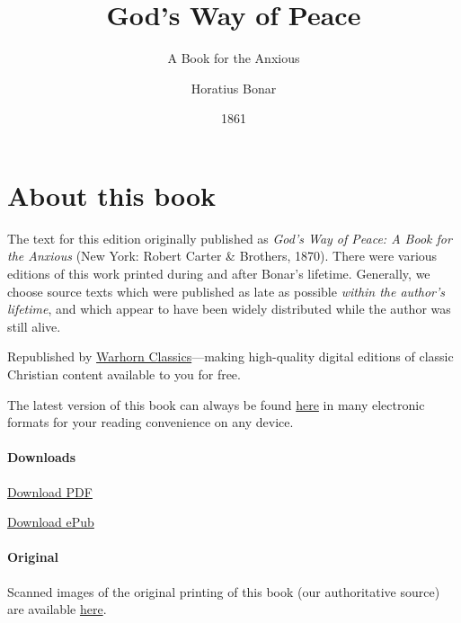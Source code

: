 \documentclass[
]{book}
\title{God's Way of Peace}
\subtitle{A Book for the Anxious}
\author{Horatius Bonar}
\date{1861}
\begin{document}
\maketitle

\mainmatter
{}

{
\setcounter{tocdepth}{1}
\tableofcontents
}
\hypertarget{about-this-book}{%
\chapter*{About this book}\label{about-this-book}}

The text for this edition originally published as \emph{God's Way of Peace: A Book for the Anxious} (New York: Robert Carter \& Brothers, 1870). There were various editions of this work printed during and after Bonar's lifetime. Generally, we choose source texts which were published as late as possible \emph{within the author's lifetime}, and which appear to have been widely distributed while the author was still alive.

Republished by \href{https://classics.warhornmedia.com/}{Warhorn Classics}---making high-quality digital editions of classic Christian content available to you for free.

The latest version of this book can always be found \href{https://warhornmedia.github.io/bonar-peace/}{here} in many electronic formats for your reading convenience on any device.

\hypertarget{downloads}{%
\subsubsection*{Downloads}\label{downloads}}

\href{https://warhornmedia.github.io/bonar-peace//Bonar-Peace.pdf}{Download PDF}

\href{https://warhornmedia.github.io/bonar-peace//Bonar-Peace.epub}{Download ePub}

\hypertarget{original}{%
\subsubsection*{Original}\label{original}}

Scanned images of the original printing of this book (our authoritative source) are available \href{https://archive.org/details/godswayofpeacebo00bona/page/n5/mode/2up}{here}.
\end{document}
